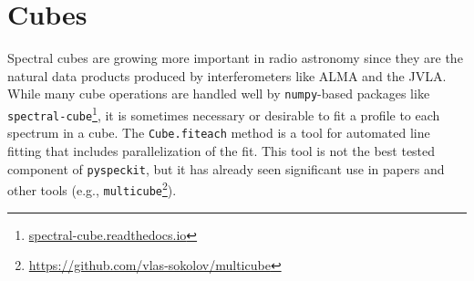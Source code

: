 \documentclass[twocolumn]{aastex61}
\newcommand{\pyspeckit}{\texttt{pyspeckit}\xspace}
\begin{document}
\section{Cubes}
Spectral cubes are growing more important in radio astronomy since they are the
natural data products produced by interferometers like ALMA and the JVLA.
While many cube operations are handled well by \texttt{numpy}-based packages
like \texttt{spectral-cube}\footnote{\url{spectral-cube.readthedocs.io}},
it is sometimes necessary or desirable to fit a profile to each spectrum
in a cube.  The \texttt{Cube.fiteach} method is a tool for automated line
fitting that includes parallelization of the fit.  This tool is not the best
tested component of \pyspeckit, but it has already seen significant use in
papers and other tools (e.g.,
\texttt{multicube}\footnote{\url{https://github.com/vlas-sokolov/multicube}}).


\end{document}
